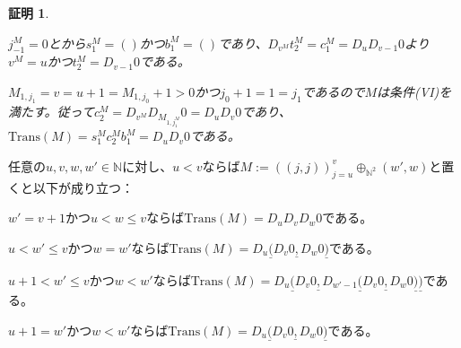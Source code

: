 \documentclass[dvipdfmx,uplatex]{jsarticle}
\theoremstyle{customnonumberbreakfortheorem}
\theoremstyle{customnonumberbreakforproof}
\newtheorem{hideableproof}{証明}
\begin{document}
\begin{hideableproof}
\begin{indented}
\begin{indented}
			\item \(j_{-1}^M = 0\)とから\(s_1^M = ()\)かつ\(b_1^M = ()\)であり、\(D_{v^M} t_2^M = c_1^M = D_u D_{v-1} 0\)より\(v^M = u\)かつ\(t_2^M = D_{v-1} 0\)である。
			\begin{indented}
				\item \(M_{1,j_1} = v = u+1 = M_{1,j_0}+1 > 0\)かつ\(j_0+1 = 1 = j_1\)であるので\(M\)は条件(VI)を満たす。従って\(c_2^M = D_{v^M} D_{M_{1,j_1^M}} 0 = D_u D_v 0\)であり、\(\textrm{Trans}(M) = s_1^M c_2^M b_1^M = D_u D_v 0\)である。
			\end{indented}
		\end{indented}
	\end{indented}
\end{hideableproof}

\begin{corollary}\label{Predが公差(1,1)のペア数列のTransの基本性質}
	任意の\(u,v,w,w' \in \mathbb{N}\)に対し、\(u < v\)ならば\(M := ((j,j))_{j=u}^{v} \oplus_{\mathbb{N}^2} (w',w)\)と置くと以下が成り立つ：
	\begin{penumerate}
		\item \(w' = v+1\)かつ\(u < w \leq v\)ならば\(\textrm{Trans}(M) = D_u D_v D_w 0\)である。
		\item \(u < w' \leq v\)かつ\(w = w'\)ならば\(\textrm{Trans}(M) = D_u \underline{(} D_v 0 \underline{,} D_w 0 \underline{)}\)である。
		\item \(u+1 < w' \leq v\)かつ\(w < w'\)ならば\(\textrm{Trans}(M) = D_u \underline{(} D_v 0 \underline{,} D_{w'-1} \underline{(} D_v 0 \underline{,} D_w 0 \underline{)} \underline{)}\)である。
		\item \(u+1 = w'\)かつ\(w < w'\)ならば\(\textrm{Trans}(M) = D_u \underline{(} D_v 0 \underline{,} D_w 0 \underline{)}\)である。
	\end{penumerate}
\end{corollary}
\end{document}
